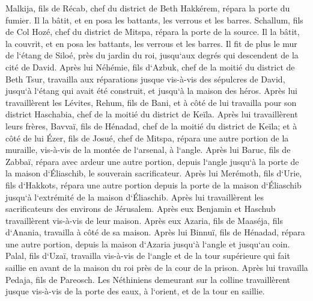 \verse Malkija, fils de Récab, chef du district de Beth Hakkérem, répara la porte du fumier. Il la bâtit, et en posa les battants, les verrous et les barres. 
\verse Schallum, fils de Col Hozé, chef du district de Mitspa, répara la porte de la source. Il la bâtit, la couvrit, et en posa les battants, les verrous et les barres. Il fit de plus le mur de l`étang de Siloé, près du jardin du roi, jusqu`aux degrés qui descendent de la cité de David. 
\verse Après lui Néhémie, fils d`Azbuk, chef de la moitié du district de Beth Tsur, travailla aux réparations jusque vis-à-vis des sépulcres de David, jusqu`à l`étang qui avait été construit, et jusqu`à la maison des héros. 
\verse Après lui travaillèrent les Lévites, Rehum, fils de Bani, et à côté de lui travailla pour son district Haschabia, chef de la moitié du district de Keïla. 
\verse Après lui travaillèrent leurs frères, Bavvaï, fils de Hénadad, chef de la moitié du district de Keïla; 
\verse et à côté de lui Ézer, fils de Josué, chef de Mitspa, répara une autre portion de la muraille, vis-à-vis de la montée de l`arsenal, à l`angle. 
\verse Après lui Baruc, fils de Zabbaï, répara avec ardeur une autre portion, depuis l`angle jusqu`à la porte de la maison d`Éliaschib, le souverain sacrificateur. 
\verse Après lui Merémoth, fils d`Urie, fils d`Hakkots, répara une autre portion depuis la porte de la maison d`Éliaschib jusqu`à l`extrémité de la maison d`Éliaschib. 
\verse Après lui travaillèrent les sacrificateurs des environs de Jérusalem. 
\verse Après eux Benjamin et Haschub travaillèrent vis-à-vis de leur maison. Après eux Azaria, fils de Maaséja, fils d`Anania, travailla à côté de sa maison. 
\verse Après lui Binnuï, fils de Hénadad, répara une autre portion, depuis la maison d`Azaria jusqu`à l`angle et jusqu`au coin. 
\verse Palal, fils d`Uzaï, travailla vis-à-vis de l`angle et de la tour supérieure qui fait saillie en avant de la maison du roi près de la cour de la prison. Après lui travailla Pedaja, fils de Pareosch. 
\verse Les Néthiniens demeurant sur la colline travaillèrent jusque vis-à-vis de la porte des eaux, à l`orient, et de la tour en saillie. 
